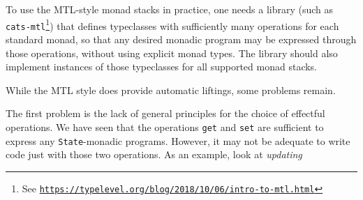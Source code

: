 To use the MTL-style monad stacks in practice, one needs a library
(such as \texttt{cats-mtl}\footnote{See \texttt{\href{https://typelevel.org/blog/2018/10/06/intro-to-mtl.html}{https://typelevel.org/blog/2018/10/06/intro-to-mtl.html}}})
that defines typeclasses with sufficiently many operations for each
standard monad, so that any desired monadic program may be expressed
through those operations, without using explicit monad types. The
library should also implement instances of those typeclasses for all
supported monad stacks. 

While the MTL style does provide automatic liftings, some problems
remain. 

The first problem is the lack of general principles for the choice
of effectful operations. We have seen that the operations \lstinline!get!
and \lstinline!set! are sufficient to express any \lstinline!State!-monadic
programs. However, it may not be adequate to write code just with
those two operations. As an example, look at \emph{updating}

